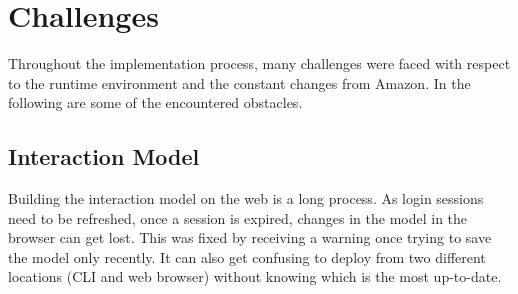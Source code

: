 
%
%
%


%
%










































\section{Challenges}
\label{challenges:design}



Throughout the implementation process, many challenges were faced with respect to the runtime environment and the constant changes from Amazon.
In the following are some of the encountered  obstacles.

\subsection*{Interaction Model}
Building the interaction model on the web is a long process. %
As login sessions need to be refreshed, once a session is expired, changes in the model in the browser can get lost. This was fixed by receiving a warning once trying to save the model only recently.
It can also get confusing to deploy from two different locations (CLI and web browser) without knowing which is the most up-to-date. 

